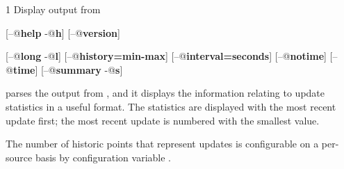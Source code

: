 \begin{ManPage}{\label{man-condor-updates-stats}}{1}
{Display output from }


\Synopsis {}
[\verb@--@\textbf{help} \Bar{} \verb@-@\textbf{h}] \Bar{} [\verb@--@\textbf{version}]

[\verb@--@\textbf{long} \Bar{} \verb@-@\textbf{l}]
[\verb@--@\textbf{history=\lt{}min\gt{}-\lt{}max\gt{}}]
[\verb@--@\textbf{interval=\lt{}seconds\gt{}}]
[\verb@--@\textbf{notime}]
[\verb@--@\textbf{time}]
[\verb@--@\textbf{summary} \Bar{} \verb@-@\textbf{s}]





\Description 

 parses the output from ,
and it displays the information relating to update statistics
in a useful format.
The statistics are displayed with the most recent update first;
the most recent update is numbered with the smallest value.

The number of historic points that represent updates is
configurable on a per-source basis by configuration variable
.


\end{ManPage}
